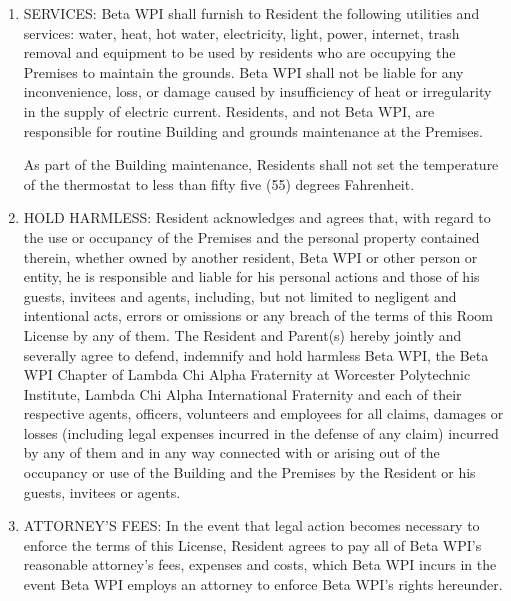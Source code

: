 \documentclass[legalpaper, 12pt]{article}
\begin{document}
\begin{enumerate}
        \item SERVICES\@: Beta WPI shall furnish to Resident the following
                utilities and services: water, heat, hot water, electricity,
                light, power, internet, trash removal and equipment to be used
                by residents who are occupying the Premises to maintain the
                grounds.  Beta WPI shall not be liable for any inconvenience,
                loss, or damage caused by insufficiency of heat or irregularity
                in the supply of electric current.  Residents, and not Beta WPI,
                are responsible for routine Building and grounds maintenance at
                the Premises.

                As part of the Building maintenance, Residents shall not set the
                temperature of the thermostat to less than fifty five (55)
                degrees Fahrenheit.

        \item HOLD HARMLESS\@: Resident acknowledges and agrees that, with regard
                to the use or occupancy of the Premises and the personal
                property contained therein, whether owned by another resident,
                Beta WPI or other person or entity, he is responsible and liable
                for his personal actions and those of his guests, invitees and
                agents, including, but not limited to negligent and intentional
                acts, errors or omissions or any breach of the terms of this
                Room License by any of them.  The Resident and Parent(s) hereby
                jointly and severally agree to defend, indemnify and hold
                harmless Beta WPI, the Beta WPI Chapter of Lambda Chi Alpha
                Fraternity at Worcester Polytechnic Institute, Lambda Chi Alpha
                International Fraternity and each of their respective agents,
                officers, volunteers and employees for all claims, damages or
                losses (including legal expenses incurred in the defense of any
                claim) incurred by any of them and in any way connected with or
                arising out of the occupancy or use of the Building and the
                Premises by the Resident or his guests, invitees or agents.

        \item ATTORNEY'S FEES\@: In the event that legal action becomes necessary
                to enforce the terms of this License, Resident agrees to pay all
                of Beta WPI’s reasonable attorney’s fees, expenses and costs,
                which Beta WPI incurs in the event Beta WPI employs an attorney
                to enforce Beta WPI’s rights hereunder.


\end{enumerate}
\end{document}
